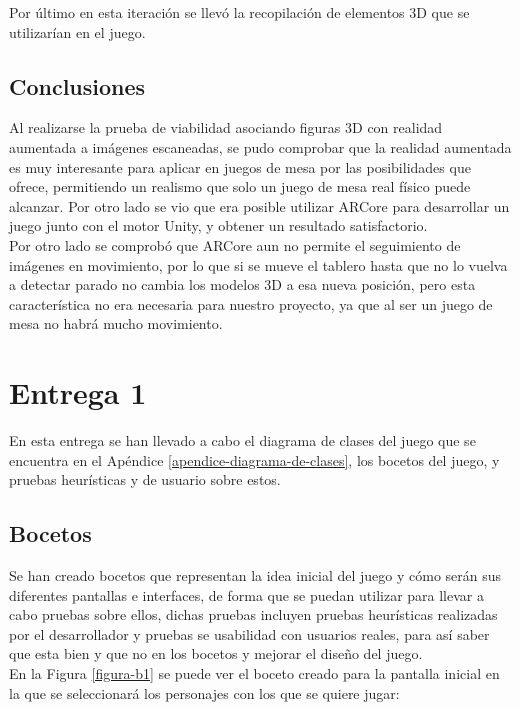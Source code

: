 Por último en esta iteración se llevó la recopilación de elementos 3D que se utilizarían en el juego.

\subsection{Conclusiones}
Al realizarse la prueba de viabilidad asociando figuras 3D con realidad aumentada a imágenes escaneadas, se pudo comprobar que la realidad aumentada es muy interesante para aplicar en juegos de mesa por las posibilidades que ofrece, permitiendo un realismo que solo un juego de mesa real físico puede alcanzar. Por otro lado se vio que era posible utilizar ARCore para desarrollar un juego junto con el motor Unity, y obtener un resultado satisfactorio.\\

Por otro lado se comprobó que ARCore aun no permite el seguimiento de imágenes en movimiento, por lo que si se mueve el tablero hasta que no lo vuelva a detectar parado no cambia los modelos 3D a esa nueva posición, pero esta característica no era necesaria para nuestro proyecto, ya que al ser un juego de mesa no habrá mucho movimiento.

\section{Entrega 1}
En esta entrega se han llevado a cabo el diagrama de clases del juego que se encuentra en el Apéndice \ref{apendice-diagrama-de-clases}, los bocetos del juego, y pruebas heurísticas y de usuario sobre estos.

\subsection{Bocetos}
Se han creado bocetos que representan la idea inicial del juego y cómo serán sus diferentes pantallas e interfaces, de forma que se puedan utilizar para llevar a cabo pruebas sobre ellos, dichas pruebas incluyen pruebas heurísticas realizadas por el desarrollador y pruebas se usabilidad con usuarios reales, para así saber que esta bien y que no en los bocetos y mejorar el diseño del juego.\\

En la Figura \ref{figura-b1} se puede ver el boceto creado para la pantalla inicial en la que se seleccionará los personajes con los que se quiere jugar:

